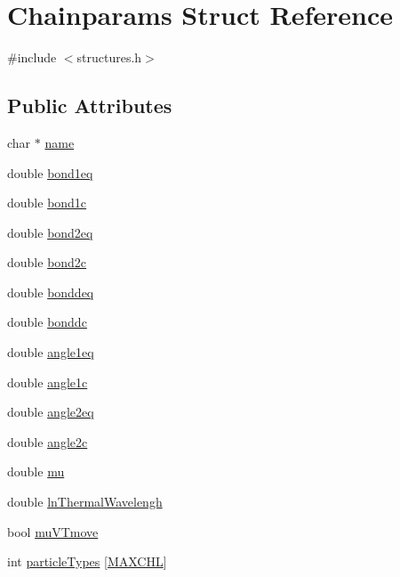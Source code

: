 \hypertarget{struct_chainparams}{\section{Chainparams Struct Reference}
\label{struct_chainparams}
}


{\ttfamily \#include $<$structures.\+h$>$}

\subsection*{Public Attributes}
\begin{DoxyCompactItemize}
\item 
char $\ast$ \hyperlink{struct_chainparams_a5b2a5b0e02644a6540922c86ec2745c2}{name}
\item 
double \hyperlink{struct_chainparams_aa13c95186a5f8173a5544df1b06d1348}{bond1eq}
\item 
double \hyperlink{struct_chainparams_a2ea341d92e24f590f56cf0d27c6d3969}{bond1c}
\item 
double \hyperlink{struct_chainparams_a498b69bd6587cb26ccb0b446815b1d28}{bond2eq}
\item 
double \hyperlink{struct_chainparams_a6a9b80bc95d1270a1463fa6f0c14181f}{bond2c}
\item 
double \hyperlink{struct_chainparams_a5e4a862a9fdb932f408f41949878400a}{bonddeq}
\item 
double \hyperlink{struct_chainparams_ab5378c99ff596b75eb9ad13a94abb924}{bonddc}
\item 
double \hyperlink{struct_chainparams_a537551faeb55ad7c9bd83c1943d8b97d}{angle1eq}
\item 
double \hyperlink{struct_chainparams_ae377484ddc4411f11302f201d6cb9877}{angle1c}
\item 
double \hyperlink{struct_chainparams_a68eb658f0342e48c3caec8397888f580}{angle2eq}
\item 
double \hyperlink{struct_chainparams_ac53e6751edf1bfa8dfec837c54c4deab}{angle2c}
\item 
double \hyperlink{struct_chainparams_a8b4693f8f1c2016cef75346171d11fe7}{mu}
\item 
double \hyperlink{struct_chainparams_a0e817d1426af84a625d94f6885ec04b9}{ln\+Thermal\+Wavelengh}
\item 
bool \hyperlink{struct_chainparams_ad5fd909308c144630b1f7a8f22cfd915}{mu\+V\+Tmove}
\item 
int \hyperlink{struct_chainparams_af91ce9382aa5752a5b97300da4205494}{particle\+Types} \mbox{[}\hyperlink{macros_8h_a6ba68031db49c489a6a5902f87b915c8}{M\+A\+X\+C\+H\+L}\mbox{]}
\end{DoxyCompactItemize}


